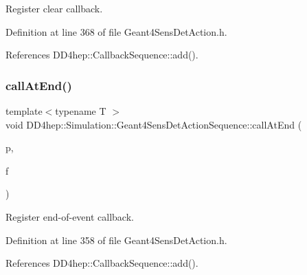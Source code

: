Register clear callback. 



Definition at line 368 of file Geant4\+Sens\+Det\+Action.\+h.



References D\+D4hep\+::\+Callback\+Sequence\+::add().

\hypertarget{class_d_d4hep_1_1_simulation_1_1_geant4_sens_det_action_sequence_aaba81a735f1ea292242434042174965b}{}\label{class_d_d4hep_1_1_simulation_1_1_geant4_sens_det_action_sequence_aaba81a735f1ea292242434042174965b} 
\subsubsection{\texorpdfstring{call\+At\+End()}{callAtEnd()}}
{\footnotesize\ttfamily template$<$typename T $>$ \\
void D\+D4hep\+::\+Simulation\+::\+Geant4\+Sens\+Det\+Action\+Sequence\+::call\+At\+End (\begin{DoxyParamCaption}\item[{\hyperlink{class_t}{T} $\ast$}]{p,  }\item[{void(T\+::$\ast$)(G4\+H\+Cof\+This\+Event $\ast$)}]{f }\end{DoxyParamCaption})\hspace{0.3cm}{\ttfamily [inline]}}



Register end-\/of-\/event callback. 



Definition at line 358 of file Geant4\+Sens\+Det\+Action.\+h.



References D\+D4hep\+::\+Callback\+Sequence\+::add().

\hypertarget{class_d_d4hep_1_1_simulation_1_1_geant4_sens_det_action_sequence_aa9a28a577e7167e18f9312febfe67657}{}\label{class_d_d4hep_1_1_simulation_1_1_geant4_sens_det_action_sequence_aa9a28a577e7167e18f9312febfe67657} 
